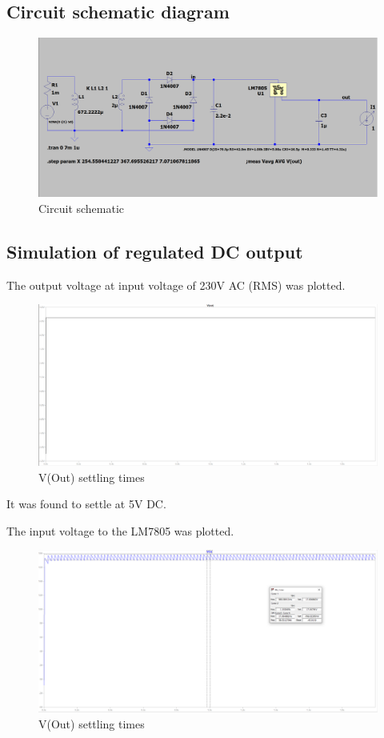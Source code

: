 \documentclass{article}
\begin{document}
\newpage
\subsection{Circuit schematic diagram}

\begin{figure}[h!]
\centerline{\includegraphics[scale=.4]{Images/1.PNG}}
\caption{Circuit schematic}
\label{figb}
\end{figure}


\subsection{Simulation of regulated DC output}

The output voltage at input voltage of 230V AC (RMS) was plotted. 

\begin{figure}[h!]
\centerline{\includegraphics[scale=.4]{Images/2.PNG}}
\caption{V(Out) settling times}
\label{figb}
\end{figure}

It was found to settle at 5V DC.

The input voltage to the LM7805 was plotted. 

\newpage
\begin{figure}[h!]
\centerline{\includegraphics[scale=.4]{Images/3.PNG}}
\caption{V(Out) settling times}
\label{figb}
\end{figure}
\end{document}
